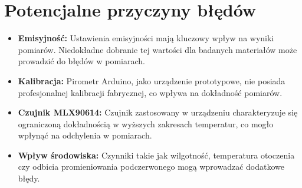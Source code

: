 \section{Potencjalne przyczyny błędów}
\begin{itemize}
    \item \textbf{Emisyjność:} Ustawienia emisyjności mają kluczowy wpływ na wyniki pomiarów. Niedokładne dobranie tej wartości dla badanych materiałów może prowadzić do błędów w pomiarach.
    \item \textbf{Kalibracja:} Pirometr Arduino, jako urządzenie prototypowe, nie posiada profesjonalnej kalibracji fabrycznej, co wpływa na dokładność pomiarów.
    \item \textbf{Czujnik MLX90614:} Czujnik zastosowany w urządzeniu charakteryzuje się ograniczoną dokładnością w wyższych zakresach temperatur, co mogło wpłynąć na odchylenia w pomiarach.
    \item \textbf{Wpływ środowiska:} Czynniki takie jak wilgotność, temperatura otoczenia czy odbicia promieniowania podczerwonego mogą wprowadzać dodatkowe błędy.
\end{itemize}


